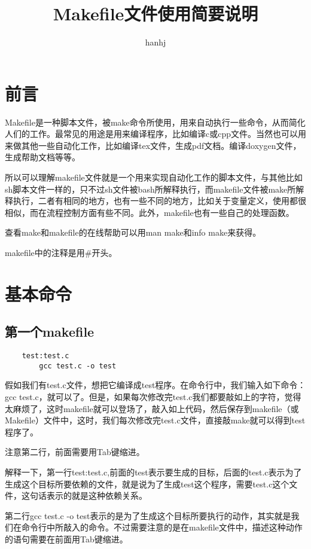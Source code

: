 \documentclass{article}
\begin{document}
\begin{CJK}{UTF8}{gbsn}
\title{Makefile文件使用简要说明}
\author{hanhj}
\maketitle
	\section*{前言}
	Makefile是一种脚本文件，被make命令所使用，用来自动执行一些命令，从而简化人们的工作。最常见的用途是用来编译程序，比如编译c或cpp文件。当然也可以用来做其他一些自动化工作，比如编译tex文件，生成pdf文档。编译doxygen文件，生成帮助文档等等。
	\par
	所以可以理解makefile文件就是一个用来实现自动化工作的脚本文件，与其他比如sh脚本文件一样的，只不过sh文件被bash所解释执行，而makefile文件被make所解释执行，二者有相同的地方，也有一些不同的地方，比如关于变量定义，使用都很相似，而在流程控制方面有些不同。此外，makefile也有一些自己的处理函数。\par
	查看make和makefile的在线帮助可以用man make和info make来获得。\par
	makefile中的注释是用\#开头。
	\section{基本命令}
	\subsection{第一个makefile}
	\begin{verbatim}
	test:test.c
	    gcc test.c -o test
	\end{verbatim}
	\par
	假如我们有test.c文件，想把它编译成test程序。在命令行中，我们输入如下命令：gcc test.c，就可以了。但是，如果每次修改完test.c我们都要敲如上的字符，觉得太麻烦了，这时makefile就可以登场了，敲入如上代码，然后保存到makefile（或Makefile）文件中，这时，我们每次修改完test.c文件，直接敲make就可以得到test程序了。


	注意第二行，前面需要用Tab键缩进。
	\par
		解释一下，第一行test:test.c,前面的test表示要生成的目标，后面的test.c表示为了生成这个目标所要依赖的文件，就是说为了生成test这个程序，需要test.c这个文件，这句话表示的就是这种依赖关系。  
	\par
	第二行gcc test.c -o test表示的是为了生成这个目标所要执行的动作，其实就是我们在命令行中所敲入的命令。不过需要注意的是在makefile文件中，描述这种动作的语句需要在前面用Tab键缩进。\\
	   \\


\end{CJK}
\end{document}
